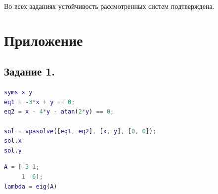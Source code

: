 \documentclass[a4paper,12pt]{article}
\begin{document}
	Во всех заданиях устойчивость рассмотренных систем подтверждена.
	
	

	\newpage
	\section{Приложение}
	
	\subsection*{Задание 1.}
	
\begin{lstlisting}[caption=Решение системы нелинейных уравнений, language=matlab]
syms x y
eq1 = -3*x + y == 0;
eq2 = x - 4*y - atan(2*y) == 0;

sol = vpasolve([eq1, eq2], [x, y], [0, 0]);
sol.x 
sol.y
\end{lstlisting}

\begin{lstlisting}[caption=Поиск собственных значений матрицы, language=matlab]
A = [-3 1;
	 1 -6];
lambda = eig(A)
\end{lstlisting}
\end{document}
